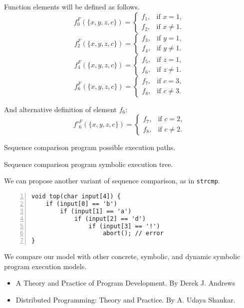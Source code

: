 Function elements will be defined as follows.
\[ f_0^F(\{x, y, z, c\}) =
    \begin{cases}
        f_1, & \text{if }x = 1, \\
        f_2, & \text{if }x \neq 1.
    \end{cases} \]
\[ f_2^F(\{x, y, z, c\}) =
    \begin{cases}
        f_3, & \text{if }y = 1, \\
        f_4, & \text{if }y \neq 1.
    \end{cases} \]
\[ f_4^F(\{x, y, z, c\}) =
    \begin{cases}
        f_5, & \text{if }z = 1, \\
        f_6, & \text{if }z \neq 1.
    \end{cases} \]
\[ f_6^F(\{x, y, z, c\}) =
    \begin{cases}
        f_7, & \text{if }c = 3, \\
        f_8, & \text{if }c \neq 3.
    \end{cases} \]

And alternative definition of element $f_6$:
\[ f'_6^F(\{x, y, z, c\}) =
    \begin{cases}
        f_7, & \text{if }c = 2, \\
        f_8, & \text{if }c \neq 2.
    \end{cases} \]

    {Sequence comparison program possible execution paths.}

    {Sequence comparison program symbolic execution tree.}

We can propose another variant of sequence comparison, as in \texttt{strcmp}.
\begin{lstlisting}[numbers=left,numberstyle=\scriptsize]
void top(char input[4]) {
    if (input[0] == 'b')
        if (input[1] == 'a')
            if (input[2] == 'd')
                if (input[3] == '!')
                    abort(); // error
}
\end{lstlisting}


We compare our model with other concrete, symbolic, and dynamic symbolic
program execution models.

\begin{itemize}
    \item A Theory and Practice of Program Development.
        By Derek J. Andrews
    \item Distributed Programming: Theory and Practice.
        By A. Udaya Shankar.
\end{itemize}

